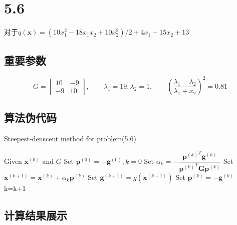 \newpage
\section{5.6}
对于$q(\bm{x})=(10x_1^2-18x_1x_2+10x_2^2)/2+4x_1-15x_2+13$

\subsection{重要参数}

\[G=\begin{bmatrix}
10&-9\\
-9&10
\end{bmatrix},\qquad \lambda_1=19,\lambda_2=1,\qquad (\dfrac {\lambda_{1}-\lambda_{2}}{\lambda_{1}+x_{2}})^2 =0.81\]

\subsection{算法伪代码}
\begin{algorithm}[h]  
\caption{Steepest-denscent method for problem(5.6)}  
\begin{algorithmic}[1]  
\STATE Given $\bm{x}^{(0)}$ and $G$
\STATE Set $\bm{p}^{(0)}=-\bm{g}^{(0)},k=0$
\STATE Set $\alpha_k=-\dfrac{{{\bm{p}^{(k)}}^T}\bm{g}^{(k)}}{{\bm{p}^{(k)}}^T\bm{G}\bm{p}^{(k)}}$
\STATE Set $\bm{x}^{(k+1)}=\bm{x}^{(k)}+\alpha_k\bm{p}^{(k)}$
\STATE Set $\bm{g}^{(k+1)}=g(\bm{x}^{(k+1)})$
\STATE Set $\bm{p}^{(k)}=-\bm{g}^{(k)}$
\STATE k=k+1
\ENDWHILE
\end{algorithmic}  
\end{algorithm}  

\subsection{计算结果展示}

